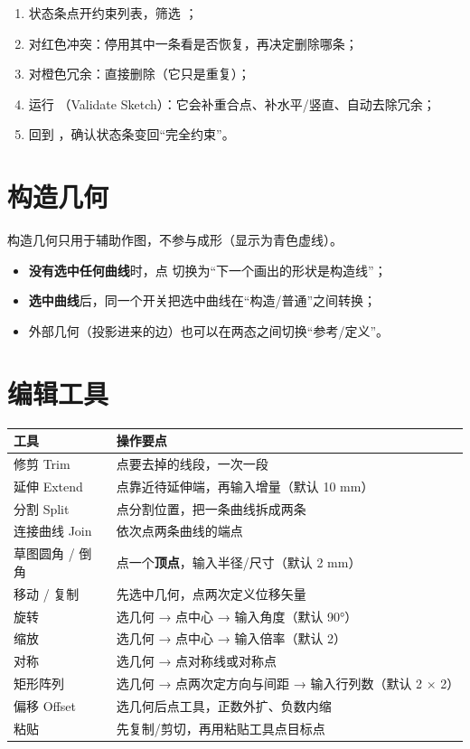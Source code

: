 \begin{practice}[冲突处理的标准流程]
\begin{enumerate}
  \item 状态条点开约束列表，筛选 ；
  \item 对红色冲突：停用其中一条看是否恢复，再决定删除哪条；
  \item 对橙色冗余：直接删除（它只是重复）；
  \item 运行 （Validate Sketch）：它会补重合点、补水平/竖直、自动去除冗余；
  \item 回到 ，确认状态条变回“完全约束”。
\end{enumerate}
\end{practice}

\section{构造几何}

构造几何只用于辅助作图，不参与成形（显示为青色虚线）。

\begin{itemize}
  \item \textbf{没有选中任何曲线}时，点  切换为“下一个画出的形状是构造线”；
  \item \textbf{选中曲线}后，同一个开关把选中曲线在“构造/普通”之间转换；
  \item 外部几何（投影进来的边）也可以在两态之间切换“参考/定义”。
\end{itemize}

\section{编辑工具}

\begin{center}
\small
\begin{tabularx}{\linewidth}{@{}lX@{}}
\toprule
\textbf{工具} & \textbf{操作要点} \\
\midrule
修剪 Trim & 点要去掉的线段，一次一段 \\
延伸 Extend & 点靠近待延伸端，再输入增量（默认 10 mm）\\
分割 Split & 点分割位置，把一条曲线拆成两条 \\
连接曲线 Join & 依次点两条曲线的端点 \\
草图圆角 / 倒角 & 点一个\textbf{顶点}，输入半径/尺寸（默认 2 mm）\\
移动 / 复制 & 先选中几何，点两次定义位移矢量 \\
旋转 & 选几何 → 点中心 → 输入角度（默认 90°）\\
缩放 & 选几何 → 点中心 → 输入倍率（默认 2）\\
对称 & 选几何 → 点对称线或对称点 \\
矩形阵列 & 选几何 → 点两次定方向与间距 → 输入行列数（默认 2 × 2）\\
偏移 Offset & 选几何后点工具，正数外扩、负数内缩 \\
粘贴 & 先复制/剪切，再用粘贴工具点目标点 \\
\bottomrule
\end{tabularx}
\end{center}

